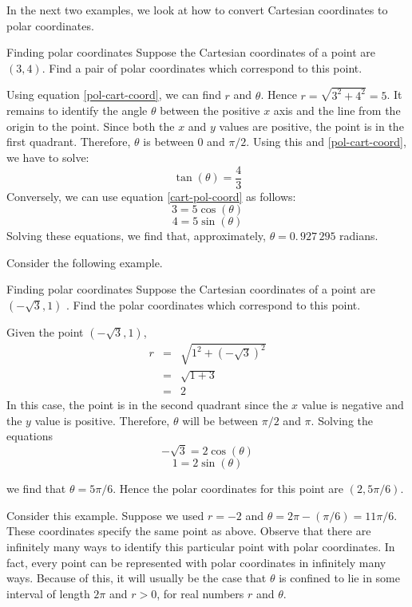 In the next two examples, we look at how to convert Cartesian coordinates to polar coordinates.

\begin{example}{Finding polar coordinates}{}
Suppose the Cartesian coordinates of a point are $(3,4)$. Find
a pair of polar coordinates which correspond to this point.
\end{example}

\begin{solution}
Using equation {\eqref{pol-cart-coord}}, we can find $r$ and $\theta$. Hence $r=\sqrt{3^{2}+4^{2}}=5$. It remains to identify the angle $\theta$ between the positive $x$ axis and the line from the origin to the point. Since both the $x$ and $y$ values are positive, the point is in the
first quadrant. Therefore, $\theta$ is between $0$ and $\pi/2$.
Using this and {\eqref{pol-cart-coord}}, we have to solve:
\[
\tan(\theta)=\frac{4}{3}
\]
Conversely, we can use equation {\eqref{cart-pol-coord}} as follows:
\[
3=5\cos (\theta)
\]
\[
4 = 5\sin (\theta)
\]
Solving these equations, we find that,
approximately, $\theta =0.\, 927\,295$ radians.
\end{solution}

Consider the following example.

\begin{example}{Finding polar coordinates}{}
Suppose the Cartesian coordinates of a point are $(-\sqrt{3},1)$
. Find the polar coordinates which correspond to this point.
\end{example}

\begin{solution}
Given the point $(-\sqrt{3}, 1)$,
\begin{eqnarray*}
r &=& \sqrt{ 1^2 + (-\sqrt{3})^2}\\
&=& \sqrt{1 + 3}\\
&=&2
\end{eqnarray*}
 In this case, the point is in the second quadrant since the $x$ value is negative and the $y$ value is positive. Therefore, $\theta$ will be between $\pi/2$ and $\pi$.
Solving the equations
\[
-\sqrt{3}= 2 \cos (\theta)
\]
\[
1 = 2 \sin (\theta)
\]

we find that $\theta = 5\pi /6$.
Hence the polar coordinates for this point are $(2, 5\pi /6)$.
\end{solution}

Consider this example. Suppose we used $r=-2$ and $\theta =2\pi -(\pi /6) = 11\pi /6$. These coordinates specify the same point as above. Observe that there are infinitely many ways to identify this
particular point with polar coordinates. In fact, every point can be represented with polar coordinates in infinitely many ways. Because of this, it will usually be
the case that $\theta $ is confined to lie in some interval
of length $2\pi $ and $r>0$, for real numbers $r$ and $\theta$.

